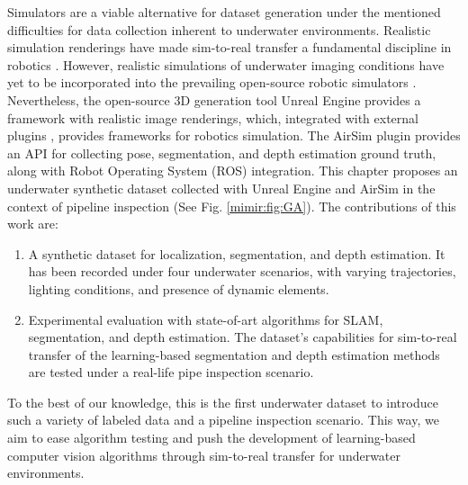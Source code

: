Simulators are a viable alternative for dataset generation under the mentioned difficulties for data collection inherent to underwater environments. Realistic simulation renderings have made sim-to-real transfer a fundamental discipline in robotics \cite{intro:simtoreal,intro:pencilnet}.
However, realistic simulations of underwater imaging conditions \cite{alvarez2019generation,song2021deep} have yet to be incorporated into the prevailing open-source robotic simulators \cite{manhaes2016uuv,uwsim,projectdave}. Nevertheless, the open-source 3D generation tool Unreal Engine provides a framework with realistic image renderings, which, integrated with external plugins \cite{intro:rw:HoloOcean22icra, rw:shah2018airsim}, provides frameworks for robotics simulation. The AirSim plugin \cite{rw:shah2018airsim} provides an API for collecting pose, segmentation, and depth estimation ground truth, along with Robot Operating System (ROS)  integration.
This chapter proposes an underwater synthetic dataset collected with Unreal Engine and AirSim in the context of pipeline inspection (See Fig. \ref{mimir:fig:GA}).
The contributions of this work are:
\begin{enumerate}
    \item A synthetic dataset for localization, segmentation, and depth estimation. It has been recorded under four underwater scenarios, with varying trajectories, lighting conditions, and presence of dynamic elements.
    \item Experimental evaluation with state-of-art algorithms for \ac{SLAM}, segmentation, and depth estimation. The dataset's capabilities for sim-to-real transfer of the learning-based segmentation and depth estimation methods are tested under a real-life pipe inspection scenario.

\end{enumerate}

To the best of our knowledge, this is the first underwater dataset to introduce such a variety of labeled data and a pipeline inspection scenario. This way, we aim to ease algorithm testing and push the development of learning-based computer vision algorithms through sim-to-real transfer for underwater environments.

